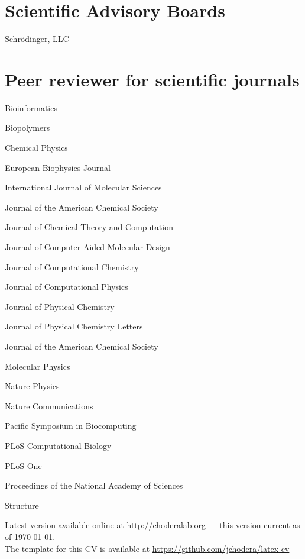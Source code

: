 \documentclass[10pt]{article}
\newcommand{\years}[1]{\marginpar{\quad \small #1}}
\begin{document}
\section*{Scientific Advisory Boards}

\noindent\years{\scshape Nov 2013--}Schr\"{o}dinger, LLC

\section*{Peer reviewer for scientific journals}

Bioinformatics

Biopolymers

Chemical Physics

European Biophysics Journal

International Journal of Molecular Sciences

Journal of the American Chemical Society

Journal of Chemical Theory and Computation

Journal of Computer-Aided Molecular Design

Journal of Computational Chemistry

Journal of Computational Physics

Journal of Physical Chemistry

Journal of Physical Chemistry Letters

Journal of the American Chemical Society

Molecular Physics

Nature Physics

Nature Communications

Pacific Symposium in Biocomputing

PLoS Computational Biology

PLoS One

Proceedings of the National Academy of Sciences

Structure

\vfill{}
\hrulefill

\begin{center}
{\footnotesize 
Latest version available online at \href{http://www.choderalab.org}{http://choderalab.org} --- this version current as of \today.\\
The template for this CV is available at \href{https://github.com/jchodera/latex-cv}{https://github.com/jchodera/latex-cv}}
\end{center}
\end{document}
